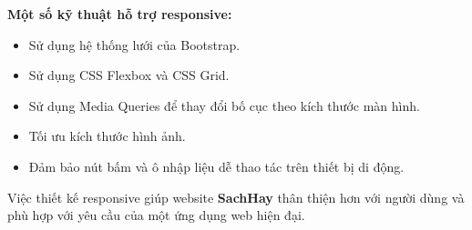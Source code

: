 \textbf{Một số kỹ thuật hỗ trợ responsive:}

\begin{itemize}
	\item Sử dụng hệ thống lưới của Bootstrap.
	\item Sử dụng CSS Flexbox và CSS Grid.
	\item Sử dụng Media Queries để thay đổi bố cục theo kích thước màn hình.
	\item Tối ưu kích thước hình ảnh.
	\item Đảm bảo nút bấm và ô nhập liệu dễ thao tác trên thiết bị di động.
\end{itemize}

Việc thiết kế responsive giúp website \textbf{SachHay} thân thiện hơn với người dùng và phù hợp với yêu cầu của một ứng dụng web hiện đại.

